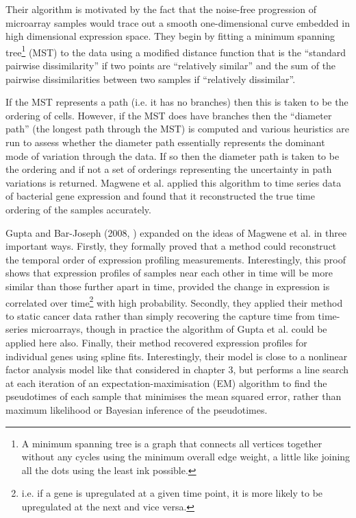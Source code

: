 Their algorithm is motivated by the fact that the noise-free progression of microarray samples would trace out a smooth one-dimensional curve embedded in high dimensional expression space. They begin by fitting a minimum spanning tree\footnote{
A minimum spanning tree is a graph that connects all vertices together without any cycles using the minimum overall edge weight, a little like joining all the dots using the least ink possible.
} (MST) to the data using a modified distance function that is the ``standard pairwise dissimilarity'' if two points are ``relatively similar'' and the sum of the pairwise dissimilarities between two samples if ``relatively dissimilar''.

If the MST represents a path (i.e. it has no branches) then this is taken to be the ordering of cells. However, if the MST does have branches then the ``diameter path'' (the longest path through the MST) is computed and various heuristics are run to assess whether the diameter path essentially represents the dominant mode of variation through the data. If so then the diameter path is taken to be the ordering and if not a set of orderings representing the uncertainty in path variations is returned. Magwene et al. applied this algorithm to time series data of bacterial gene expression and found that it reconstructed the true time ordering of the samples accurately.

Gupta and Bar-Joseph (2008, \cite{Gupta2008-fd}) expanded on the ideas of Magwene et al. in three important ways. Firstly, they formally proved that a method could reconstruct the temporal order of expression profiling measurements. Interestingly, this proof shows that expression profiles of samples near each other in time will be more similar than those further apart in time, provided the change in expression is correlated over time\footnote{i.e. if a gene is upregulated at a given time point, it is more likely to be upregulated at the next and vice versa.} with high probability.
Secondly, they applied their method to static cancer data rather than simply recovering the capture time from time-series microarrays, though in practice the algorithm of Gupta et al. could be applied here also. Finally, their method recovered expression profiles for individual genes using spline fits. Interestingly, their model is close to a nonlinear factor analysis model like that considered in chapter 3, but performs a line search at each iteration of an expectation-maximisation (EM) algorithm to find the pseudotimes of each sample that minimises the mean squared error, rather than maximum likelihood or Bayesian inference of the pseudotimes.

